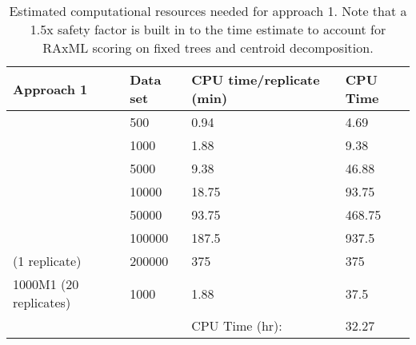 \documentclass[11pt]{article}
\begin{document}
\begin{table}[h]
\centering
\begin{tabular}{llll}
\hline
Approach 1             & Data set & CPU time/replicate (min) & CPU Time  \\ \hline
                       & 500      & 0.94                   & 4.69    \\
                       & 1000     & 1.88                    & 9.38     \\
                       & 5000     & 9.38                    & 46.88    \\
                       & 10000    & 18.75                    & 93.75     \\
                       & 50000    & 93.75                    & 468.75    \\
                       & 100000   & 187.5                    & 937.5     \\
        (1 replicate)  & 200000   & 375                      & 375       \\
1000M1 (20 replicates) & 1000     & 1.88                    & 37.5      \\
                       &          & CPU Time (hr):           & 32.27 \\ \hline
\end{tabular}
\caption{
  Estimated computational resources needed for approach 1.
  Note that a 1.5x safety factor is built in to the time estimate
  to account for RAxML scoring on fixed trees and centroid decomposition.
  }
\label{table:approach1-compute}

\end{table}
\end{document}
